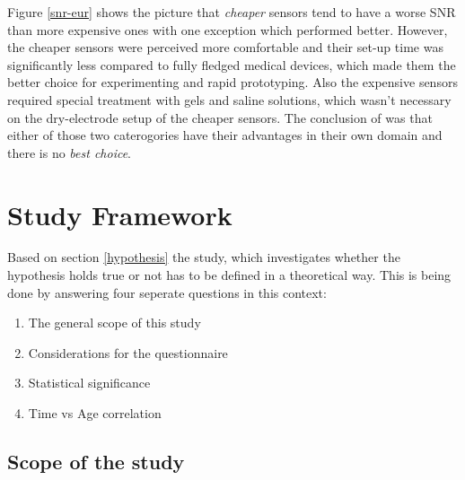             Figure \ref{snr-eur} shows the picture that \textit{cheaper} sensors tend to have a worse SNR than more expensive ones with one exception which performed better. However, the cheaper sensors were perceived more comfortable and their set-up time was significantly less compared to fully fledged medical devices, which made them the better choice for experimenting and rapid prototyping. Also the expensive sensors required special treatment with gels and saline solutions, which wasn't necessary on the dry-electrode setup of the cheaper sensors. The conclusion of \cite{Zerafa.2018} was that either of those two caterogories have their advantages in their own domain and there is no \textit{best choice}.

    \chapter{Study Framework}\label{survey-framework}

        Based on section \ref*{hypothesis} the study, which investigates whether the hypothesis holds true or not has to be defined in a theoretical way. This is being done by answering four seperate questions in this context:

        \begin{enumerate}
            \item The general scope of this study
            \item Considerations for the questionnaire
            \item Statistical significance
            \item Time vs Age correlation
        \end{enumerate}

        \section{Scope of the study}\label{study-scope}


